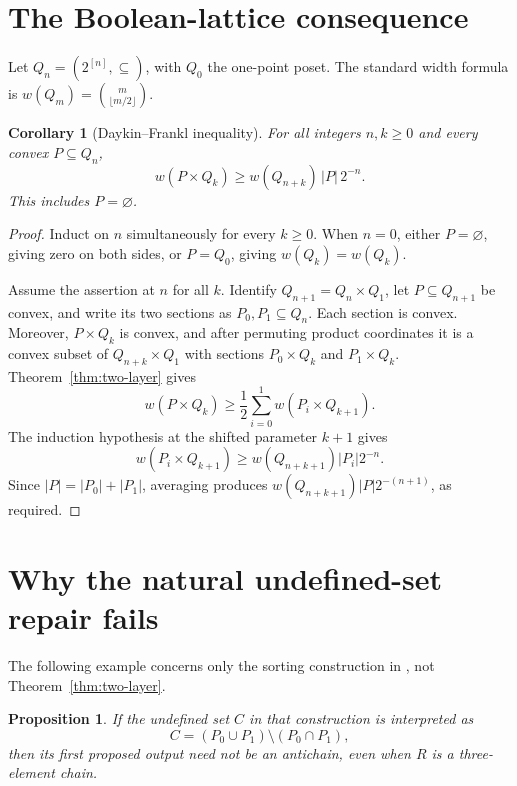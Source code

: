 \documentclass[11pt]{article}
\newtheorem{proposition}[theorem]{Proposition}
\newtheorem{corollary}[theorem]{Corollary}
\newcommand{\Q}{Q}
\begin{document}
\section{The Boolean-lattice consequence}

Let $\Q_n=(2^{[n]},\subseteq)$, with $\Q_0$ the one-point poset.  The
standard width formula is
$w(\Q_m)=\binom{m}{\lfloor m/2\rfloor}$.

\begin{corollary}[Daykin--Frankl inequality]\label{cor:DF}
For all integers $n,k\geq0$ and every convex $P\subseteq\Q_n$,
\[
 w(P\times\Q_k)\geq w(\Q_{n+k})\,|P|\,2^{-n}.
\]
This includes $P=\varnothing$.
\end{corollary}

\begin{proof}
Induct on $n$ simultaneously for every $k\geq0$.  When $n=0$, either
$P=\varnothing$, giving zero on both sides, or $P=\Q_0$, giving
$w(\Q_k)=w(\Q_k)$.

Assume the assertion at $n$ for all $k$.  Identify
$\Q_{n+1}=\Q_n\times\Q_1$, let $P\subseteq\Q_{n+1}$ be convex, and write
its two sections as $P_0,P_1\subseteq\Q_n$.  Each section is convex.
Moreover, $P\times\Q_k$ is convex, and after permuting product coordinates
it is a convex subset of $\Q_{n+k}\times\Q_1$ with sections
$P_0\times\Q_k$ and $P_1\times\Q_k$.  Theorem~\ref{thm:two-layer} gives
\[
 w(P\times\Q_k)
 \geq\frac12\sum_{i=0}^1 w(P_i\times\Q_{k+1}).
\]
The induction hypothesis at the shifted parameter $k+1$ gives
\[
 w(P_i\times\Q_{k+1})
 \geq w(\Q_{n+k+1})|P_i|2^{-n}.
\]
Since $|P|=|P_0|+|P_1|$, averaging produces
$w(\Q_{n+k+1})|P|2^{-(n+1)}$, as required.
\end{proof}

\section{Why the natural undefined-set repair fails}

The following example concerns only the sorting construction in
\cite[Section~3]{Williams2026}, not Theorem~\ref{thm:two-layer}.

\begin{proposition}\label{prop:source-failure}
If the undefined set $C$ in that construction is interpreted as
\[
 C=(P_0\cup P_1)\setminus(P_0\cap P_1),
\]
then its first proposed output need not be an antichain, even when $R$ is a
three-element chain.
\end{proposition}
\end{document}
